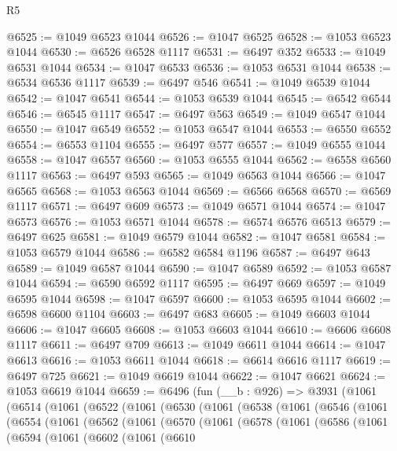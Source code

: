 \begin{lexlean}{R5}
\begin{coremodule}
@6525 := @1049 @6523 @1044
@6526 := @1047 @6525
@6528 := @1053 @6523 @1044
@6530 := @6526 @6528 @1117
@6531 := @6497 @352
@6533 := @1049 @6531 @1044
@6534 := @1047 @6533
@6536 := @1053 @6531 @1044
@6538 := @6534 @6536 @1117
@6539 := @6497 @546
@6541 := @1049 @6539 @1044
@6542 := @1047 @6541
@6544 := @1053 @6539 @1044
@6545 := @6542 @6544
@6546 := @6545 @1117
@6547 := @6497 @563
@6549 := @1049 @6547 @1044
@6550 := @1047 @6549
@6552 := @1053 @6547 @1044
@6553 := @6550 @6552
@6554 := @6553 @1104
@6555 := @6497 @577
@6557 := @1049 @6555 @1044
@6558 := @1047 @6557
@6560 := @1053 @6555 @1044
@6562 := @6558 @6560 @1117
@6563 := @6497 @593
@6565 := @1049 @6563 @1044
@6566 := @1047 @6565
@6568 := @1053 @6563 @1044
@6569 := @6566 @6568
@6570 := @6569 @1117
@6571 := @6497 @609
@6573 := @1049 @6571 @1044
@6574 := @1047 @6573
@6576 := @1053 @6571 @1044
@6578 := @6574 @6576 @6513
@6579 := @6497 @625
@6581 := @1049 @6579 @1044
@6582 := @1047 @6581
@6584 := @1053 @6579 @1044
@6586 := @6582 @6584 @1196
@6587 := @6497 @643
@6589 := @1049 @6587 @1044
@6590 := @1047 @6589
@6592 := @1053 @6587 @1044
@6594 := @6590 @6592 @1117
@6595 := @6497 @669
@6597 := @1049 @6595 @1044
@6598 := @1047 @6597
@6600 := @1053 @6595 @1044
@6602 := @6598 @6600 @1104
@6603 := @6497 @683
@6605 := @1049 @6603 @1044
@6606 := @1047 @6605
@6608 := @1053 @6603 @1044
@6610 := @6606 @6608 @1117
@6611 := @6497 @709
@6613 := @1049 @6611 @1044
@6614 := @1047 @6613
@6616 := @1053 @6611 @1044
@6618 := @6614 @6616 @1117
@6619 := @6497 @725
@6621 := @1049 @6619 @1044
@6622 := @1047 @6621
@6624 := @1053 @6619 @1044
@6659 := @6496
    (fun (__b : @926) =>
    @3931
      (@1061
        (@6514
          (@1061
            (@6522
              (@1061
                (@6530
                  (@1061
                    (@6538
                      (@1061
                        (@6546
                          (@1061
                            (@6554
                              (@1061
                                (@6562
                                  (@1061
                                    (@6570
                                      (@1061
                                        (@6578
                                          (@1061
                                            (@6586
                                              (@1061
                                                (@6594
                                                  (@1061
                                                    (@6602
                                                      (@1061
                                                        (@6610

\end{coremodule}
\end{lexlean}
